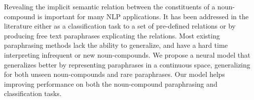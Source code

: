 Revealing the implicit semantic relation between the constituents of a noun-compound is important for many NLP applications. It has been addressed in the literature either as a classification task to a set of pre-defined relations or by producing free text paraphrases explicating the relations. Most existing paraphrasing methods lack the ability to generalize, and have a hard time interpreting infrequent or new noun-compounds. We propose a neural model that generalizes better by representing paraphrases in a continuous space,  generalizing for both unseen noun-compounds and rare paraphrases. Our model helps improving performance on both the noun-compound paraphrasing and classification tasks.
